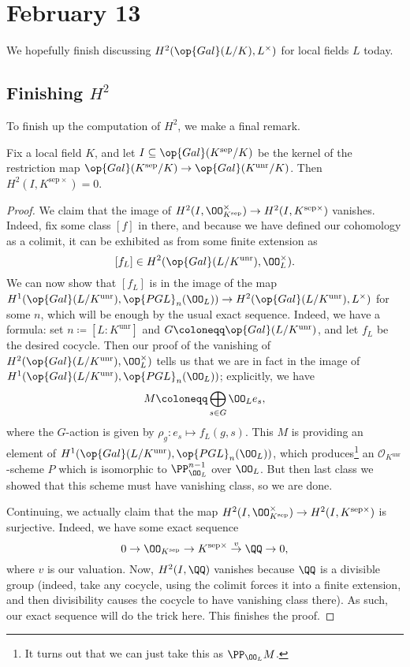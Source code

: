 \documentclass[../notes.tex]{subfiles}
\begin{document}
\section{February 13}

We hopefully finish discussing $H^2(\op{Gal}(L/K),L^\times)$ for local fields $L$ today.

\subsection{Finishing \texorpdfstring{$H^2$}{ H2}}
To finish up the computation of $H^2$, we make a final remark.
\begin{proposition}
	Fix a local field $K$, and let $I\subseteq\op{Gal}(K^{\mathrm{sep}}/K)$ be the kernel of the restriction map $\op{Gal}(K^{\mathrm{sep}}/K)\to\op{Gal}(K^{\mathrm{unr}}/K)$. Then $H^2(I,K^{\mathrm{sep}\times})=0$.
\end{proposition}
\begin{proof}
	We claim that the image of $H^2(I,\OO_{K^{\mathrm{sep}}}^\times)\to H^2(I,K^{\mathrm{sep}\times})$ vanishes. Indeed, fix some class $[f]$ in there, and because we have defined our cohomology as a colimit, it can be exhibited as from some finite extension as
	\[[f_L]\in H^2(\op{Gal}(L/K^{\mathrm{unr}}),\OO_L^\times).\]
	We can now show that $[f_L]$ is in the image of the map $H^1(\op{Gal}(L/K^{\mathrm{unr}}),\op{PGL}_n(\OO_L))\to H^2(\op{Gal}(L/K^{\mathrm{unr}}),L^\times)$ for some $n$, which will be enough by the usual exact sequence. Indeed, we have a formula: set $n\coloneqq[L:K^{\mathrm{unr}}]$ and $G\coloneqq\op{Gal}(L/K^{\mathrm{unr}})$, and let $f_L$ be the desired cocycle. Then our proof of the vanishing of $H^2(\op{Gal}(L/K^{\mathrm{unr}}),\OO_L^\times)$ tells us that we are in fact in the image of $H^1(\op{Gal}(L/K^{\mathrm{unr}}),\op{PGL}_n(\OO_L))$; explicitly, we have
	\[M\coloneqq\bigoplus_{s\in G}\OO_Le_s,\]
	where the $G$-action is given by $\rho_g\colon e_s\mapsto f_L(g,s)$. This $M$ is providing an element of $H^1(\op{Gal}(L/K^{\mathrm{unr}}),\op{PGL}_n(\OO_L))$, which produces\footnote{It turns out that we can just take this as $\PP_{\OO_L}M$.} an $\mathcal O_{K^{\mathrm{unr}}}$-scheme $P$ which is isomorphic to $\PP^{n-1}_{\OO_L}$ over $\OO_L$. But then last class we showed that this scheme must have vanishing class, so we are done.

	Continuing, we actually claim that the map $H^2(I,\OO_{K^{\mathrm{sep}}}^\times)\to H^2(I,K^{\mathrm{sep}\times})$ is surjective. Indeed, we have some exact sequence
	\[0\to\OO_{K^{\mathrm{sep}}}\to K^{\mathrm{sep}\times}\stackrel v\to\QQ\to0,\]
	where $v$ is our valuation. Now, $H^2(I,\QQ)$ vanishes because $\QQ$ is a divisible group (indeed, take any cocycle, using the colimit forces it into a finite extension, and then divisibility causes the cocycle to have vanishing class there). As such, our exact sequence will do the trick here. This finishes the proof.
\end{proof}
\end{document}
